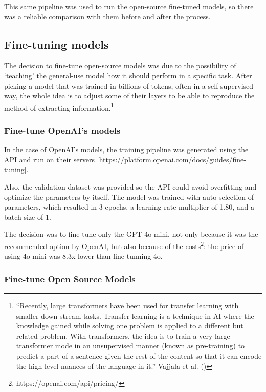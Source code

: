 \documentclass[
  12pt,
]{article}
\begin{document}
This same pipeline was used to run the open-source fine-tuned models, so
there was a reliable comparison with them before and after the process.

\subsection{Fine-tuning models}\label{fine-tuning-models}

The decision to fine-tune open-source models was due to the possibility
of `teaching' the general-use model how it should perform in a specific
task. After picking a model that was trained in billions of tokens,
often in a self-supervised way, the whole idea is to adjust some of
their layers to be able to reproduce the method of extracting
information.\footnote{``Recently, large transformers have been used for
  transfer learning with smaller down‐stream tasks. Transfer learning is
  a technique in AI where the knowledge gained while solving one problem
  is applied to a different but related problem. With transformers, the
  idea is to train a very large transformer mode in an unsupervised
  manner (known as pre-training) to predict a part of a sentence given
  the rest of the content so that it can encode the high-level nuances
  of the language in it.'' Vajjala et al.
  ()}

\subsubsection{Fine-tune OpenAI's
models}\label{fine-tune-openais-models}

In the case of OpenAI's models, the training pipeline was generated
using the API and run on their servers
{[}https://platform.openai.com/docs/guides/fine-tuning{]}.

Also, the validation dataset was provided so the API could avoid
overfitting and optimize the parameters by itself. The model was trained
with auto-selection of parameters, which resulted in 3 epochs, a
learning rate multiplier of 1.80, and a batch size of 1.

The decision was to fine-tune only the GPT 4o-mini, not only because it
was the recommended option by OpenAI, but also because of the
costs\footnote{https://openai.com/api/pricing/}: the price of using
4o-mini was 8.3x lower than fine-tunning 4o.

\subsubsection{Fine-tune Open Source
Models}\label{fine-tune-open-source-models}
\end{document}

